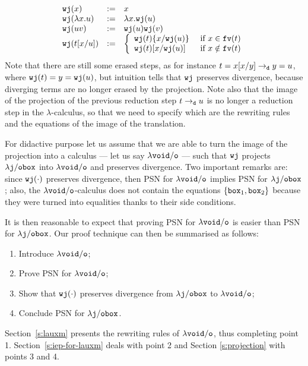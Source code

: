 \documentclass{LMCS}
\renewcommand{\>}{\rightarrow}
\def\lam{\lambda}
\newcommand{\Rew}[1]{\rightarrow_{#1}}
\newcommand{\isubs}[1]{ \{ #1  \} }
\newcommand{\dis}{{\tt j}}
\newcommand{\fv}[1]{{\tt fv}(#1)}
\newcommand{\Var}{{\tt d}}
\newcommand{\Gc}{{\tt w}}
\newcommand{\set}[1]{ \{ #1 \}}
\newcommand{\wfc}{\Gc\dis}
\newcommand{\modulo}[2]{#1/#2}
\newcommand{\ldisf}{\lam \modulo{\dis}{\fsymb}}
\newcommand{\fsymb}{\osymb\boite}
\newcommand{\osymb}{{\tt o}}
\newcommand{\aux}{{\tt void}}
\newcommand{\lauxm}{\lam\modulo{ \aux }{ \osymb }}
\newcommand{\boite}{{\tt box}}
\newcommand{\sigt}{\boite_1}
\newcommand{\sigq}{\boite_2}
\begin{document}
\begin{equation}
 \begin{array}{lll}
   \wfc(x) & := & x\\
   \wfc(\lam x. u) & := & \lam x. \wfc(u)\\
   \wfc(u v) & := & \wfc(u) \wfc(v)\\
   \wfc(t[x/u]) & := & \left \{ \begin{array}{ll}
                        \wfc(t) \isubs{x/\wfc(u)} & \mbox{ if } x \in \fv{t} \\
                        \wfc(t) [x/\wfc(u)] & \mbox{ if } x \notin \fv{t} \\
                        \end{array} \right . 
   \end{array}  
\end{equation} 
Note that there are still some erased steps, as for instance
$t=x[x/y]\Rew{\Var} y=u$, where $\wfc(t) = y = \wfc(u)$, but intuition
tells that $\wfc$ preserves divergence, because diverging terms
  are no longer erased by the projection. Note also that the image of the projection of
the previous reduction step $t \Rew{\Var} u$ is no longer a reduction
step in the $\lam$-calculus, so that we need to specify which are the
rewriting rules and the equations of the image of the
translation.  \medskip

For didactive purpose let us assume that we are able to turn the image
of the projection into a calculus --- let us say $\lauxm$ --- such that
$\wfc$ projects $\ldisf$ into $\lauxm$ and preserves divergence. Two
important remarks are: since $\wfc(\cdot)$ preserves divergence, then
PSN for $\lauxm$ implies PSN for $\ldisf$; also, the $\lauxm$-calculus
does not contain the equations $\set{\sigt,\sigq}$ because
they were turned into equalities thanks to their side conditions.


It is then reasonable  to expect that proving PSN for $\lauxm$
 is easier
than PSN for $\ldisf$. Our proof technique can then be summarised as follows:
\begin{enumerate}[(1)]
  \item Introduce $\lauxm$;
  \item Prove PSN for $\lauxm$; 
  \item Show that $\wfc(\cdot)$ preserves divergence from $\ldisf$ to $\lauxm$;
  \item Conclude PSN for $\ldisf$.
\end{enumerate}

Section~\ref{s:lauxm} presents the rewriting rules of
$\lauxm$, thus completing point 1. Section~\ref{s:iep-for-lauxm} deals with point
2 and Section \ref{s:projection} with points 3 and 4.\medskip
\end{document}
